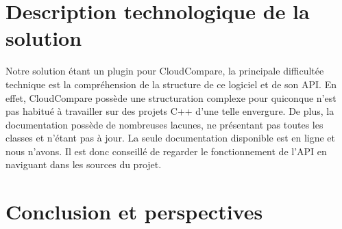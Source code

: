 \documentclass[12pt,titlepage,french]{article}
\begin{document}
\section{Description technologique de la solution}
Notre solution étant un plugin pour CloudCompare, la principale difficultée technique est la compréhension de la structure de ce logiciel et de son API.
En effet, CloudCompare possède une structuration complexe pour quiconque n'est pas habitué à travailler sur des projets C++ d'une telle envergure.
De plus, la documentation possède de nombreuses lacunes, ne présentant pas toutes les classes et n'étant pas à jour. La seule documentation disponible est en ligne et nous n'avons.
Il est donc conseillé de regarder le fonctionnement de l'API en naviguant dans les sources du projet.

\section{Conclusion et perspectives}
\end{document}
